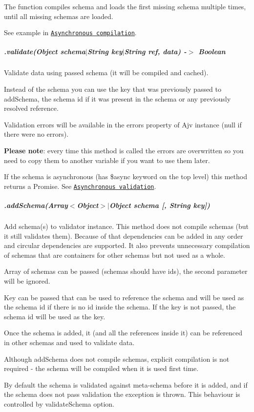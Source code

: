 The function compiles schema and loads the first missing schema multiple times, until all missing schemas are loaded.

See example in \href{#asynchronous-compilation}{\tt Asynchronous compilation}.

\subparagraph*{.validate(Object schema$\vert$\+String key$\vert$\+String ref, data) -\/$>$ Boolean}

Validate data using passed schema (it will be compiled and cached).

Instead of the schema you can use the key that was previously passed to {\ttfamily add\+Schema}, the schema id if it was present in the schema or any previously resolved reference.

Validation errors will be available in the {\ttfamily errors} property of Ajv instance ({\ttfamily null} if there were no errors).

{\bfseries Please note}\+: every time this method is called the errors are overwritten so you need to copy them to another variable if you want to use them later.

If the schema is asynchronous (has {\ttfamily \$async} keyword on the top level) this method returns a Promise. See \href{#asynchronous-validation}{\tt Asynchronous validation}.

\subparagraph*{.add\+Schema(Array$<$Object$>$$\vert$\+Object schema \mbox{[}, String key\mbox{]})}

Add schema(s) to validator instance. This method does not compile schemas (but it still validates them). Because of that dependencies can be added in any order and circular dependencies are supported. It also prevents unnecessary compilation of schemas that are containers for other schemas but not used as a whole.

Array of schemas can be passed (schemas should have ids), the second parameter will be ignored.

Key can be passed that can be used to reference the schema and will be used as the schema id if there is no id inside the schema. If the key is not passed, the schema id will be used as the key.

Once the schema is added, it (and all the references inside it) can be referenced in other schemas and used to validate data.

Although {\ttfamily add\+Schema} does not compile schemas, explicit compilation is not required -\/ the schema will be compiled when it is used first time.

By default the schema is validated against meta-\/schema before it is added, and if the schema does not pass validation the exception is thrown. This behaviour is controlled by {\ttfamily validate\+Schema} option.

